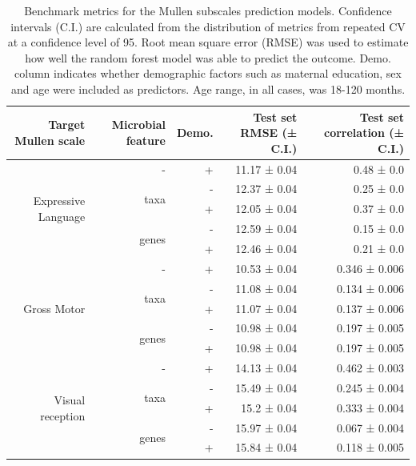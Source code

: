 \documentclass{article}
\begin{document}
\begin{table}[!h]
    \begin{center}
        \begin{tabular}{|r|r|r|r|r|}
        \hline
        \textbf{Target Mullen scale} & \textbf{Microbial feature} & \textbf{Demo.} & \textbf{Test set RMSE (± C.I.)} & \textbf{Test set correlation (± C.I.)} \\\hline
        \multirow{5}{*}{Expressive Language} & - & + & 11.17 ± 0.04 & 0.48 ± 0.0 \\ \cline{2-5}
            & \multirow{2}{*}{taxa}  & - & 12.37 ± 0.04 & 0.25 ± 0.0 \\ \cline{3-5}
            &                        & + & 12.05 ± 0.04 & 0.37 ± 0.0 \\ \cline{2-5}
            & \multirow{2}{*}{genes} & - & 12.59 ± 0.04 & 0.15 ± 0.0 \\ \cline{3-5}
            &                        & + & 12.46 ± 0.04 & 0.21 ± 0.0 \\ \cline{1-5}
        \multirow{5}{*}{Gross Motor} & - & + & 10.53 ± 0.04 & 0.346 ± 0.006 \\ \cline{2-5}
            & \multirow{2}{*}{taxa}  & - & 11.08 ± 0.04 & 0.134 ± 0.006 \\ \cline{3-5}
            &                        & + & 11.07 ± 0.04 & 0.137 ± 0.006 \\ \cline{2-5}
            & \multirow{2}{*}{genes} & - & 10.98 ± 0.04 & 0.197 ± 0.005 \\ \cline{3-5}
            &                        & + & 10.98 ± 0.04 & 0.197 ± 0.005 \\ \hline
        \multirow{5}{*}{Visual reception} & - & + & 14.13 ± 0.04 & 0.462 ± 0.003 \\ \cline{2-5}
            & \multirow{2}{*}{taxa}  & - & 15.49 ± 0.04 & 0.245 ± 0.004 \\ \cline{3-5}
            &                        & + & 15.2 ± 0.04 & 0.333 ± 0.004 \\ \cline{2-5}
            & \multirow{2}{*}{genes} & - & 15.97 ± 0.04 & 0.067 ± 0.004 \\ \cline{3-5}
            &                        & + & 15.84 ± 0.04 & 0.118 ± 0.005 \\ \hline\hline
        \end{tabular}
        \caption{\label{tab:subscalebenchmark}Benchmark metrics for the Mullen subscales prediction models.
        Confidence intervals (C.I.) are calculated from the
        distribution of metrics from repeated CV at a confidence level of 95.
        Root mean square error (RMSE) was used to estimate how well the random forest model was able to predict the outcome.
        Demo. column indicates whether demographic factors such as maternal education, sex and age were included as predictors.
        Age range, in all cases, was 18-120 months.}
    \end{center}
\end{table}
\end{document}
